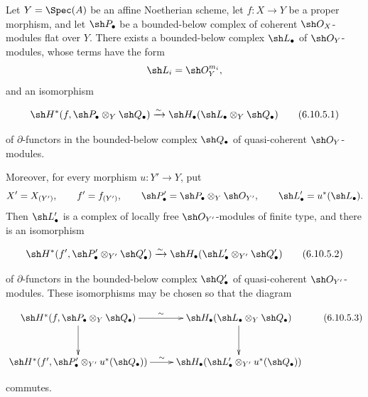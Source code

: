 \begin{theorem}[6.10.5]
\label{III.6.10.5}
Let $Y=\Spec(A)$ be an affine Noetherian scheme, let
$f:X\to Y$ be a proper morphism, and let $\sh P_\bullet$ be a
bounded-below complex of coherent $\sh O_X$-modules flat over
$Y$.  There exists a bounded-below complex $\sh L_\bullet$ of
$\sh O_Y$-modules, whose terms have the form
\[
  \sh L_i=\sh O_Y^{m_i},
\]
and an isomorphism
\begin{env}[6.10.5.1]
\label{III.6.10.5.1}
\[
  \sh H^*
  (f,\sh P_\bullet\otimes_Y\sh Q_\bullet)
  \xrightarrow{\sim}
  \sh H_\bullet
  (\sh L_\bullet\otimes_Y\sh Q_\bullet)
  \tag{6.10.5.1}\label{III.6.10.5.1.eq}
\]
\end{env}
of $\partial$-functors in the bounded-below complex
$\sh Q_\bullet$ of quasi-coherent $\sh O_Y$-modules.

Moreover, for every morphism $u:Y'\to Y$, put
\[
  X'=X_{(Y')},
  \qquad
  f'=f_{(Y')},
  \qquad
  \sh P_\bullet'
  =
  \sh P_\bullet\otimes_Y\sh O_{Y'},
  \qquad
  \sh L_\bullet'=u^*(\sh L_\bullet).
\]
Then $\sh L_\bullet'$ is a complex of locally free
$\sh O_{Y'}$-modules of finite type, and there is an isomorphism
\begin{env}[6.10.5.2]
\label{III.6.10.5.2}
\[
  \sh H^*
  (f',\sh P_\bullet'\otimes_{Y'}\sh Q_\bullet')
  \xrightarrow{\sim}
  \sh H_\bullet
  (\sh L_\bullet'\otimes_{Y'}\sh Q_\bullet')
  \tag{6.10.5.2}\label{III.6.10.5.2.eq}
\]
\end{env}
of $\partial$-functors in the bounded-below complex
$\sh Q_\bullet'$ of quasi-coherent $\sh O_{Y'}$-modules.  These
isomorphisms may be chosen so that the diagram
\begin{env}[6.10.5.3]
\label{III.6.10.5.3}
\[
\xymatrix@C=24pt@R=30pt{
  \sh H^*
  (f,\sh P_\bullet\otimes_Y\sh Q_\bullet)
  \ar[r]^-{\sim}\ar[d]
  &
  \sh H_\bullet
  (\sh L_\bullet\otimes_Y\sh Q_\bullet)
  \ar[d]
  \\
  \sh H^*
  (f',\sh P_\bullet'\otimes_{Y'}u^*(\sh Q_\bullet))
  \ar[r]^-{\sim}
  &
  \sh H_\bullet
  (\sh L_\bullet'\otimes_{Y'}u^*(\sh Q_\bullet))
}
\tag{6.10.5.3}\label{III.6.10.5.3.eq}
\]
\end{env}
commutes.
\end{theorem}

